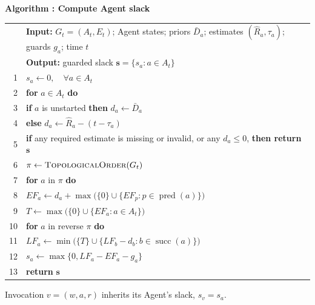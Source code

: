\par\medskip\noindent\begin{minipage}{\columnwidth}
\raggedright
{}\label{alg:slack-estimation}
\textbf{Algorithm \thedesignalgorithm: Compute Agent slack}
\par\smallskip
\begin{tabularx}{\columnwidth}{@{}r@{\quad}X@{}}
\toprule
 & \textbf{Input:} $G_t=(A_t,E_t)$; Agent states; priors $\bar D_a$;
 estimates $(\widehat R_a,\tau_a)$; guards $g_a$; time $t$ \\
 & \textbf{Output:} guarded slack $\boldsymbol{s}=\{s_a:a\in A_t\}$ \\
\midrule
1 & $s_a\gets0,\quad \forall a\in A_t$ \\
2 & \textbf{for} $a\in A_t$ \textbf{do} \\
3 & \quad \textbf{if} $a$ is unstarted \textbf{then} $d_a\gets\bar D_a$ \\
4 & \quad \textbf{else} $d_a\gets\widehat R_a-(t-\tau_a)$ \\
5 & \textbf{if} any required estimate is missing or invalid, or
 any $d_a\le0$, \textbf{then return} $\boldsymbol{s}$ \\
6 & $\pi\gets\textsc{TopologicalOrder}(G_t)$ \\
7 & \textbf{for} $a$ in $\pi$ \textbf{do} \\
8 & \quad $EF_a\gets d_a+
 \max\bigl(\{0\}\cup\{EF_p:p\in\operatorname{pred}(a)\}\bigr)$ \\
9 & $T\gets\max\bigl(\{0\}\cup\{EF_a:a\in A_t\}\bigr)$ \\
10 & \textbf{for} $a$ in reverse $\pi$ \textbf{do} \\
11 & \quad $LF_a\gets
 \min\bigl(\{T\}\cup\{LF_b-d_b:b\in\operatorname{succ}(a)\}\bigr)$ \\
12 & \quad $s_a\gets\max\{0,LF_a-EF_a-g_a\}$ \\
13 & \textbf{return} $\boldsymbol{s}$ \\
\bottomrule
\end{tabularx}
\end{minipage}\par\medskip

Invocation $v=(w,a,r)$ inherits its Agent's slack, $s_v=s_a$.

